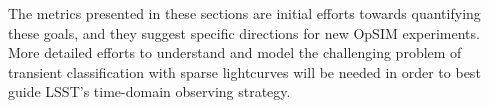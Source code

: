 The metrics presented in these sections are initial efforts towards
quantifying these goals, and they suggest specific directions for new
OpSIM experiments.  More detailed efforts to understand and model the
challenging problem of transient classification with sparse
lightcurves will be needed in order to best guide LSST's time-domain
observing strategy.












% 


% 


% 






